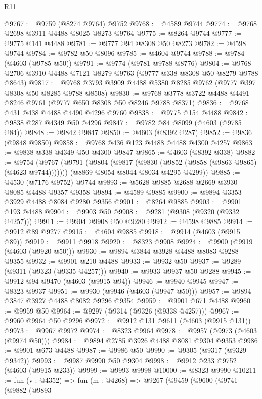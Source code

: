 \begin{lexlean}{R11}
\begin{coremodule}
@9767 := @9759 (@8274 @9764) @9752
@9768 := @4589 @9744
@9774 := @9768 @2698 @3911 @4488 @8025 @8273 @9764
@9775 := @8264 @9744
@9777 := @9775 @141 @4488
@9781 := @9777 @94 @8308 @50 @8273
@9782 := @4598 @9744
@9784 := @9782 @50 @8096
@9785 := @4604 @9744
@9788 := @9784 (@4603 (@9785 @50))
@9791 := @9774 (@9781 @9788 @8776)
@9804 := @9768 @2706 @3910 @4488 @7121 @8279 @9763 (@9777 @338 @8308 @50 @8279 @9788 @8643)
@9817 := @9768 @3793 @3909 @4488 @5380 @8285 @9762 (@9777 @397 @8308 @50 @8285 @9788 @8508)
@9830 := @9768 @3778 @3722 @4488 @4491 @8246 @9761 (@9777 @650 @8308 @50 @8246 @9788 @8371)
@9836 := @9768 @431 @438 @4488 @4490 @4296 @9760
@9838 := @9775 @154 @4488
@9842 := @9838 @287 @4349 @50 @4296
@9847 := @9782 @84 @8099 (@4603 (@9785 @84))
@9848 := @9842 @9847
@9850 := @4603 (@8392 @287)
@9852 := @9836 (@9848 @9850)
@9858 := @9768 @436 @123 @4488 @4488 @4300 @4257
@9863 := @9838 @338 @4349 @50 @4300 @9847
@9865 := @4603 (@8392 @338)
@9882 := @9754
    (@9767
      (@9791 (@9804 (@9817 (@9830 (@9852 (@9858 (@9863 @9865) (@4623 @9744)))))))
      (@8869 @8054 @8044 @8034 @4295 @4299))
@9885 := @4530 (@7176 @9752) @9744
@9893 := @5628 @9885 @2688 @2669 @3930 @8085 @4488 @9357 @9358
@9894 := @4589 @9885
@9900 := @9894 @3353 @3929 @4488 @8084 @9280 @9356
@9901 := @8264 @9885
@9903 := @9901 @193 @4488
@9904 := @9903 @50
@9908 := @9281 (@9308 (@9320 (@9332 @4257)))
@9911 := @9904 @9908 @50 @9280
@9912 := @4598 @9885
@9914 := @9912 @89 @9277
@9915 := @4604 @9885
@9918 := @9914 (@4603 (@9915 @89))
@9919 := @9911 @9918
@9920 := @8323 @9908
@9924 := @9900 (@9919 (@4603 (@9920 @50)))
@9930 := @9894 @3844 @3928 @4488 @8083 @9288 @9355
@9932 := @9901 @210 @4488
@9933 := @9932 @50
@9937 := @9289 (@9311 (@9323 (@9335 @4257)))
@9940 := @9933 @9937 @50 @9288
@9945 := @9912 @94 @9470 (@4603 (@9915 @94))
@9946 := @9940 @9945
@9947 := @8323 @9937
@9951 := @9930 (@9946 (@4603 (@9947 @50)))
@9957 := @9894 @3847 @3927 @4488 @8082 @9296 @9354
@9959 := @9901 @671 @4488
@9960 := @9959 @50
@9964 := @9297 (@9314 (@9326 (@9338 @4257)))
@9967 := @9960 @9964 @50 @9296
@9972 := @9912 @131 @9611 (@4603 (@9915 @131))
@9973 := @9967 @9972
@9974 := @8323 @9964
@9978 := @9957 (@9973 (@4603 (@9974 @50)))
@9984 := @9894 @2785 @3926 @4488 @8081 @9304 @9353
@9986 := @9901 @673 @4488
@9987 := @9986 @50
@9990 := @9305 (@9317 (@9329 @9342))
@9993 := @9987 @9990 @50 @9304
@9998 := @9912 @233 @9752 (@4603 (@9915 @233))
@9999 := @9993 @9998
@10000 := @8323 @9990
@10211 := fun (v : @4352) =>
  fun (m : @4268) =>
  @9267
    (@9459
      (@9600
        (@9741
          (@9882
            (@9893

\end{coremodule}
\end{lexlean}
